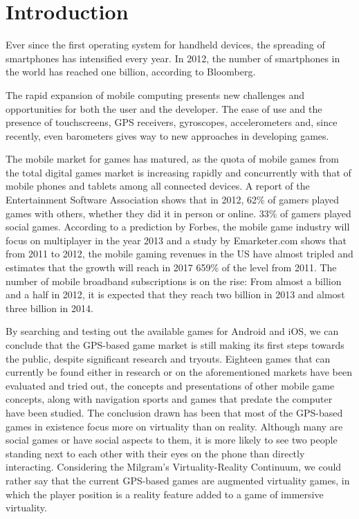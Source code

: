 \section{Introduction}

Ever since the first operating system for handheld devices, the spreading of
smartphones has intensified every year. In 2012, the number of smartphones in
the world has reached one billion, according to Bloomberg\cite{bloomberg}. \newline

The rapid expansion of mobile computing presents new challenges and
opportunities for both the user and the developer. The ease of use and the
presence of touchscreens, GPS receivers, gyroscopes, accelerometers and, since
recently, even barometers gives way to new approaches in developing
games.\newline

The mobile market for games has matured, as the quota of mobile games from the
total digital games market is increasing rapidly and concurrently with that of
mobile phones and tablets among all connected devices. A report of the
Entertainment Software Association shows that in 2012, 62\% of gamers played
games with others, whether they did it in person or online. 33\% of gamers
played social games\cite{esa}. According to a prediction by Forbes, the mobile
game industry will focus on multiplayer in the year 2013\cite{forbes}
and a study by Emarketer.com shows that from 2011 to 2012, the mobile
gaming revenues in the US have almost tripled and estimates that the
growth will reach in 2017 659\% of the level from 2011\cite{emarketer}.
The number of mobile broadband subscriptions is on the rise: From almost a
billion and a half in 2012, it is expected that they reach two billion in 2013
and almost three billion in 2014\cite{ericsson}.
\newline

By searching and testing out the available games for Android and iOS, we can
conclude that the GPS-based game market is still making its first steps towards
the public, despite significant research and tryouts. Eighteen games that can
currently be found either in research or on the aforementioned markets have been
evaluated and tried out, the concepts and presentations of other mobile game
concepts, along with navigation sports and games that predate the computer have
been studied. The conclusion drawn has been that most of the GPS-based games in
existence focus more on virtuality than on reality. Although many are social
games or have social aspects to them, it is more likely to see two people
standing next to each other with their eyes on the phone than directly
interacting. Considering the Milgram's Virtuality-Reality Continuum, we could
rather say that the current GPS-based games are augmented virtuality games, in
which the player position is a reality feature added to a game of immersive
virtuality.\newline

